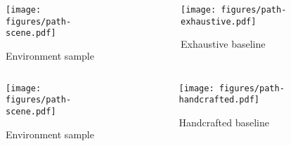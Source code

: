 \begin{frame}
    \begin{columns}
        \begin{column}{0.55\textwidth}
            \begin{figure}
                \centering
                \texttt{[image: figures/path-scene.pdf]}
                \par Environment sample
            \end{figure}
        \end{column}
        \begin{column}{0.5\textwidth}
            \begin{figure}
                \centering
                \texttt{[image: figures/path-exhaustive.pdf]}
                \par Exhaustive baseline
            \end{figure}
        \end{column}
    \end{columns}
\end{frame}

\begin{frame}
    \begin{columns}
        \begin{column}{0.55\textwidth}
            \begin{figure}
                \centering
                \texttt{[image: figures/path-scene.pdf]}
                \par Environment sample
            \end{figure}
        \end{column}
        \begin{column}{0.5\textwidth}
            \begin{figure}
                \centering
                \texttt{[image: figures/path-handcrafted.pdf]}
                \par Handcrafted baseline
            \end{figure}
        \end{column}
    \end{columns}
\end{frame}

